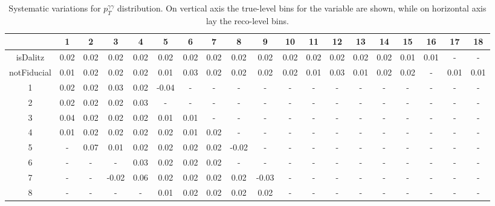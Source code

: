 \documentclass[a4paper,11pt]{article}
\begin{document}
\begin{table}[h]
\centering
\tiny
\caption{Systematic variations for $p_T^{\gamma \gamma}$ distribution. On vertical axis the true-level bins for the variable are shown, while on horizontal axis lay the reco-level bins.}
\vspace{0.4cm}
\begin{tabular}{ccccccccccccccccccc}
{} &     1 &     2 &     3 &     4 &     5 &     6 &     7 &     8 &     9 &    10 &    11 &    12 &    13 &    14 &    15 &    16 &    17 &    18 \\
\midrule
isDalitz    &  0.02 &  0.02 &  0.02 &  0.02 &  0.02 &  0.02 &  0.02 &  0.02 &  0.02 &  0.02 &  0.02 &  0.02 &  0.02 &  0.02 &  0.01 &  0.01 &     - &     - \\
notFiducial &  0.01 &  0.02 &  0.02 &  0.02 &  0.01 &  0.03 &  0.02 &  0.02 &  0.02 &  0.02 &  0.01 &  0.03 &  0.01 &  0.02 &  0.02 &     - &  0.01 &  0.01 \\
1           &  0.02 &  0.02 &  0.03 &  0.02 & -0.04 &     - &     - &     - &     - &     - &     - &     - &     - &     - &     - &     - &     - &     - \\
2           &  0.02 &  0.02 &  0.02 &  0.03 &     - &     - &     - &     - &     - &     - &     - &     - &     - &     - &     - &     - &     - &     - \\
3           &  0.04 &  0.02 &  0.02 &  0.02 &  0.01 &  0.01 &     - &     - &     - &     - &     - &     - &     - &     - &     - &     - &     - &     - \\
4           &  0.01 &  0.02 &  0.02 &  0.02 &  0.02 &  0.01 &  0.02 &     - &     - &     - &     - &     - &     - &     - &     - &     - &     - &     - \\
5           &     - &  0.07 &  0.01 &  0.02 &  0.02 &  0.02 &  0.02 & -0.02 &     - &     - &     - &     - &     - &     - &     - &     - &     - &     - \\
6           &     - &     - &     - &  0.03 &  0.02 &  0.02 &  0.02 &     - &     - &     - &     - &     - &     - &     - &     - &     - &     - &     - \\
7           &     - &     - & -0.02 &  0.06 &  0.02 &  0.02 &  0.02 &  0.02 & -0.03 &     - &     - &     - &     - &     - &     - &     - &     - &     - \\
8           &     - &     - &     - &     - &  0.01 &  0.02 &  0.02 &  0.02 &  0.02 &     - &     - &     - &     - &     - &     - &     - &     - &     - \\

\end{tabular}
\end{table}
\end{document}
